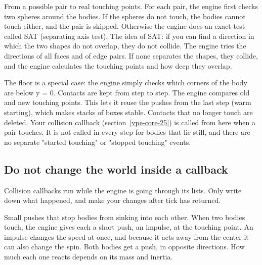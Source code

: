\documentclass[11pt,a4paper]{article}
\begin{document}
\label{vpe-core-14}
From a possible pair to real touching points. For each pair, the engine first checks two spheres around the bodies. If the spheres do not touch, the bodies cannot touch either, and the pair is skipped. Otherwise the engine does an exact test called SAT (separating axis test). The idea of SAT: if you can find a direction in which the two shapes do not overlap, they do not collide. The engine tries the directions of all faces and of edge pairs. If none separates the shapes, they collide, and the engine calculates the touching points and how deep they overlap.

\begin{center}\end{center}

The floor is a special case: the engine simply checks which corners of the body are below y = 0. Contacts are kept from step to step. The engine compares old and new touching points. This lets it reuse the pushes from the last step (warm starting), which makes stacks of boxes stable. Contacts that no longer touch are deleted. Your collision callback (section~\ref{vpe-core-25}) is called from here when a pair touches. It is not called in every step for bodies that lie still, and there are no separate "started touching" or "stopped touching" events.

\subsection*{Do not change the world inside a callback}
Collision callbacks run while the engine is going through its lists. Only write down what happened, and make your changes after tick has returned.

\label{vpe-core-15}
Small pushes that stop bodies from sinking into each other. When two bodies touch, the engine gives each a short push, an impulse, at the touching point. An impulse changes the speed at once, and because it acts away from the center it can also change the spin. Both bodies get a push, in opposite directions. How much each one reacts depends on its mass and inertia.
\end{document}
